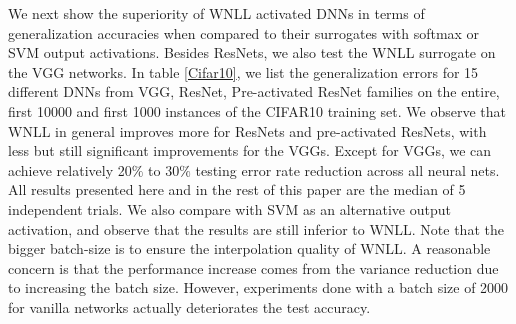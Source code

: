 \documentclass{article}
\newcommand\xmod[1]{{\textcolor{blue}{#1}}}
\begin{document}
We next show the superiority of WNLL activated DNNs in terms of generalization accuracies when compared to their surrogates with softmax or SVM output activations. Besides ResNets, we also test the WNLL surrogate on the VGG networks. In table \ref{Cifar10}, we list the generalization errors for 15 different DNNs from VGG, ResNet, Pre-activated ResNet families on the entire, first 10000 and first 1000 instances of the CIFAR10 training set. We observe that WNLL in general improves more for ResNets and pre-activated ResNets, with less but still significant improvements for the VGGs. Except for VGGs, we can achieve relatively 20$\%$ to $30\%$ testing error rate reduction across all neural nets. All results presented here and in the rest of this paper are the median of 5 independent trials. We also compare with SVM as an alternative output activation, and observe that the results are still inferior to WNLL. Note that the bigger batch-size is to ensure the interpolation quality of WNLL. A reasonable concern is that the performance increase comes from the variance reduction due to increasing the batch size. However, experiments done with a batch size of 2000 for vanilla networks actually deteriorates the test accuracy. 


\end{document}
